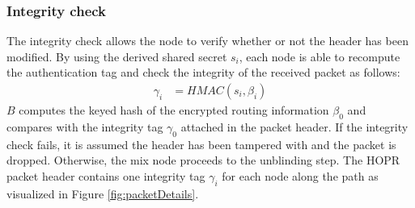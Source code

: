 \subsubsection{Integrity check}
\label{sec:sphinx:integrity}

The integrity check allows the node to verify whether or not the header has been modified. By using the derived shared secret $s_i$, each node is able to recompute the authentication tag and check the integrity of the received packet as follows:
\begin{align}
    \gamma_i & =HMAC(s_i,\beta_i)
    \label{eq:6}
\end{align}
$B$ computes the keyed hash of the encrypted routing information $\beta_0$ and compares with the integrity tag $\gamma_0$ attached in the packet header. If the integrity check fails, it is assumed the header has been tampered with and the packet is dropped. Otherwise, the mix node proceeds to the unblinding step. The HOPR packet header contains one integrity tag $\gamma_i$ for each node along the path as visualized in Figure \ref{fig:packetDetails}.